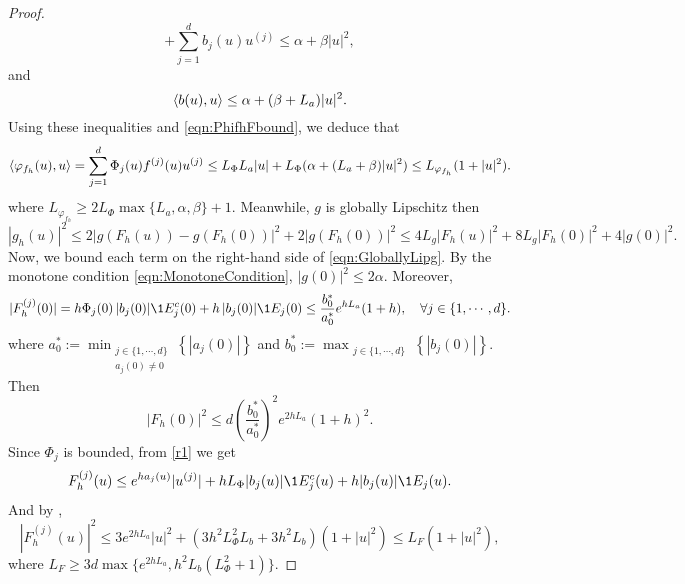 \begin{proof}
\begin{equation*}
	+
	\sum_{j=1}^d
	b_j(u) u^{(j)}
	\leq \alpha +\beta |u|^2,
\end{equation*}
and
\begin{equation*}\label{eqn:bDotProdBound}
	\left\langle b(u), u\right\rangle \leq \alpha + (\beta + L_a)|u|^2.
\end{equation*}
Using these inequalities and \eqref{eqn:PhifhFbound}, we deduce that
\begin{equation}\label{eqn:VarphifhDotProdBound}
	\left\langle\varphi_{f_h}(u), u\right\rangle 
		=\sum_{j=1}^d
		\Phi_j(u) f^{(j)}(u) u^{(j)}
		\leq L_{\Phi} L_a|u| +  L_{\Phi}(\alpha + (L_a + \beta)|u|^2) \leq
		L_{\varphi_{f_h}} (1+|u|^2).					
\end{equation}
where
	$
		L_{\varphi_{f_h}}\geq 2 L_{\Phi}\max\{L_a, \alpha, \beta\} + 1.
	$ 
Meanwhile, $g$ is globally Lipschitz then
\begin{equation}\label{eqn:GloballyLipg}
	|g_h(u)|^2 
	\leq
		2 |g(F_h(u)) - g(F_h(0))|^2  + 2 | g(F_h(0))|^2 \leq
		4 L_g |F_h(u)|^2  + 8 L_g |F_h(0)|^2  + 4 |g(0)|^2 .
\end{equation}
Now, we bound each term on the right-hand side of  \eqref{eqn:GloballyLipg}.
By the monotone condition \eqref{eqn:MonotoneCondition}, $|g(0)|^2 \leq 2\alpha$.
Moreover,
\begin{equation*}
	|F_h^{(j)} (0) |=
		h\Phi_j(0)\,| b_j(0)| \1{E_j^c}(0) + 
		h\,|b_j(0)| \1{E_j}(0)
		\leq
		\frac{b_0^*}{a_0^*}
		e^{h L_a} (1+h),
	\quad
	\forall j \in \{1, \cdots, d\}.
\end{equation*}
where
	$a^*_0 := 
	\min_{
		\substack{
			j \in \{1, \cdots, d \}\\
			a_j(0) \neq 0
		}
	}
	\left\{
		|a_j(0)|
	\right\}$
and 
	$b^*_0 :=
		\max_{\substack{
		j\in \{1,\cdots, d\}}
	}
	\left\{
		|b_j(0)|
	\right\}.$
Then
\begin{equation} \label{eqn:BoundFhZero}
	|F_h(0)|^2 
	\leq
		d\left(
			\frac{b_0^*}{a_0^*}
		\right)^2
		e^{2h L_a} (1+h)^2.
\end{equation}
Since $\Phi_j$ is bounded, from \eqref{r1} we get
\begin{dmath*}
	F_h^{(j)}(u) 
	\leq
	e^{h a_j(u)} |u^{(j)}| +
	h L_{\Phi} |b_j(u)| \1{E_j^c}(u) +h |b_j(u)| \1{E_j}(u).
\end{dmath*}
And by ,
\begin{equation}\label{eqn:BoundFhu}
	|F_h^{(j)}(u)|^2 
		\leq 3 e^{2h L_a }|u|^2 + (3 h^2 L_{\Phi}^2 L_b + 3h^ 2L_b) (1+|u|^2) 
		\leq L_F(1+|u|^2), 
\end{equation}
where $L_F\geq 3 d \max\{e^{2h L_a},  h^2 L_b(L_{\Phi}^2+1)\}$.

\end{proof}
